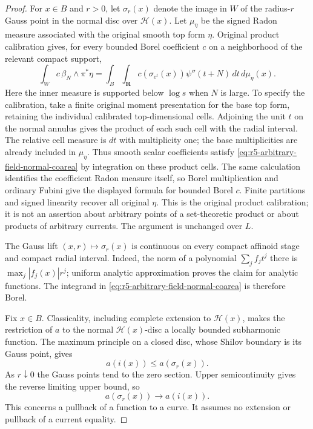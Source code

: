 \documentclass[11pt,a4paper]{article}
\numberwithin{equation}{section}
\theoremstyle{definition}
\theoremstyle{remark}
\begin{document}
\begin{proof}
For $x\in B$ and $r>0$, let $\sigma_r(x)$ denote the image in
$W$ of the radius-$r$ Gauss point in the normal disc over
$\mathscr H(x)$.  Let $\mu_\eta$ be the signed Radon measure
associated with the original smooth top form $\eta$.  Original
product calibration gives, for every bounded Borel coefficient $c$
on a neighborhood of the relevant compact support,
\begin{equation}
 \int_W c\,\beta_N\wedge\pi^*\eta
 =\int_B\int_{\mathbf R}
 c(\sigma_{e^t}(x))\psi''(t+N)\,dt\,d\mu_\eta(x).
 \label{eq:r5-arbitrary-field-normal-coarea}
\end{equation}
Here the inner measure is supported below $\log s$ when $N$ is
large.  To specify the calibration, take a finite original moment
presentation for the base top form, retaining the individual
calibrated top-dimensional cells.  Adjoining the unit $t$ on the
normal annulus gives the product of each such cell with the radial
interval.  The relative cell measure is $dt$ with multiplicity one;
the base multiplicities are already included in $\mu_\eta$.
Thus smooth scalar coefficients satisfy
\eqref{eq:r5-arbitrary-field-normal-coarea} by integration on these
product cells.  The same calculation identifies the coefficient
Radon measure itself, so Borel multiplication and ordinary Fubini
give the displayed formula for bounded Borel $c$.  Finite partitions
and signed linearity recover all original $\eta$.
This is the original product calibration; it is not an assertion
about arbitrary points of a set-theoretic product or about products
of arbitrary currents.  The argument is unchanged over $L$.

The Gauss lift $(x,r)\mapsto\sigma_r(x)$ is continuous on every
compact affinoid stage and compact radial interval.  Indeed, the norm
of a polynomial $\sum_j f_jt^j$ there is
$\max_j|f_j(x)|r^j$; uniform analytic approximation proves the
claim for analytic functions.  The integrand in
\eqref{eq:r5-arbitrary-field-normal-coarea} is therefore Borel.

Fix $x\in B$.  Classicality, including complete extension to
$\mathscr H(x)$, makes the restriction of $a$ to the normal
$\mathscr H(x)$-disc a locally bounded subharmonic function.
The maximum principle on a closed disc, whose Shilov boundary is its
Gauss point, gives
\[
 a(i(x))\leq a(\sigma_r(x)).
\]
As $r\downarrow0$ the Gauss points tend to the zero section.  Upper
semicontinuity gives the reverse limiting upper bound, so
\begin{equation}
             a(\sigma_r(x))\longrightarrow a(i(x)).
 \label{eq:r5-normal-actual-radial-limit}
\end{equation}
This concerns a pullback of a function to a curve.  It assumes no
extension or pullback of a current equality.


\end{proof}
\end{document}
